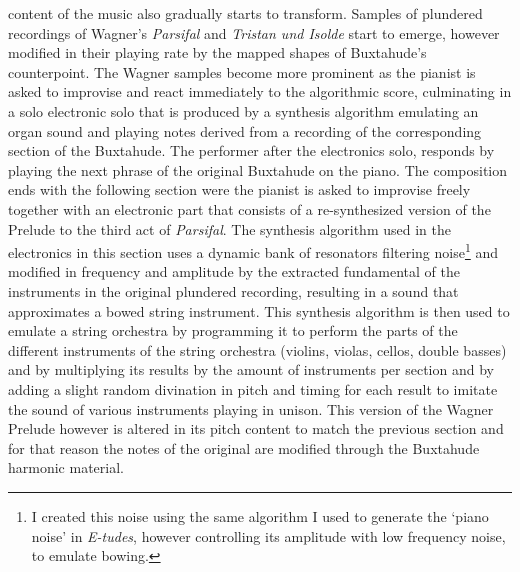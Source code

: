 content of the music also gradually starts to transform. Samples of plundered recordings of Wagner's \emph{Parsifal} and \emph{Tristan und Isolde} start to emerge, however modified in their playing rate by the mapped shapes of Buxtahude's counterpoint. The Wagner samples become more prominent as the pianist is asked to improvise and react immediately to the algorithmic score, culminating in a solo electronic solo that is produced by a synthesis algorithm emulating an organ sound and playing notes derived from a recording of the corresponding section of the Buxtahude. The performer after the electronics solo, responds by playing the next phrase of the original Buxtahude on the piano. The composition ends with the following section were the pianist is asked to improvise freely together with an electronic part that consists of a re-synthesized version of the Prelude to the third act of \emph{Parsifal}. The synthesis algorithm used in the electronics in this section uses a dynamic bank of resonators filtering noise\footnote{I created this noise using the same algorithm I used to generate the `piano noise' in \emph{E-tudes}, however controlling its amplitude with low frequency noise, to emulate bowing.} and modified in frequency and amplitude by the extracted fundamental of the instruments in the original plundered recording, resulting in a sound that approximates a bowed string instrument. This synthesis algorithm is then used to emulate a string orchestra by programming it to perform the parts of the different instruments of the string orchestra (violins, violas, cellos, double basses) and by multiplying its results by the amount of instruments per section and by adding a slight random divination in pitch and timing for each result to imitate the sound of various instruments playing in unison. This version of the Wagner Prelude however is altered in its pitch content to match the previous section and for that reason the notes of the original are modified through the Buxtahude harmonic material. 
 
